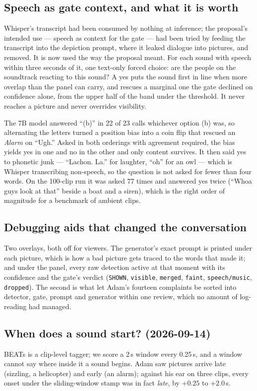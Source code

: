\documentclass[11pt,a4paper]{article}
\begin{document}
\subsection{Speech as gate context, and what it is worth}\label{sec:speechgate}
Whisper's transcript had been consumed by nothing at inference; the proposal's intended
use --- speech as context for the gate --- had been tried by feeding the transcript into
the depiction prompt, where it leaked dialogue into pictures, and removed. It is now used
the way the proposal meant. For each sound with speech within three seconds of it, one
text-only forced choice: are the people on the soundtrack reacting to this sound? A yes
puts the sound first in line when more overlap than the panel can carry, and rescues a
marginal one the gate declined on confidence alone, from the upper half of the band under
the threshold. It never reaches a picture and never overrides visibility.

The 7B model answered ``(b)'' in 22 of 23 calls whichever option (b) was, so alternating
the letters turned a position bias into a coin flip that rescued an \emph{Alarm} on
``Ugh.'' Asked in both orderings with agreement required, the bias yields yes in one and
no in the other and only content survives. It then said yes to phonetic junk ---
``Lachon. La.'' for laughter, ``oh'' for an owl --- which is Whisper transcribing
non-speech, so the question is not asked for fewer than four words. On the 100-clip run it
was asked 77 times and answered yes twice (``Whoa guys look at that'' beside a boat and a
siren), which is the right order of magnitude for a benchmark of ambient clips.

\subsection{Debugging aids that changed the conversation}\label{sec:debugstrip}
Two overlays, both off for viewers. The generator's exact prompt is printed under each
picture, which is how a bad picture gets traced to the words that made it; and under the
panel, every raw detection active at that moment with its confidence and the gate's
verdict (\texttt{SHOWN}, \texttt{visible}, \texttt{merged}, \texttt{faint},
\texttt{speech/music}, \texttt{dropped}). The second is what let Adam's fourteen complaints
be sorted into detector, gate, prompt and generator within one review, which no amount of
log-reading had managed.

\subsection{When does a sound start? (2026-09-14)}\label{sec:onset}
BEATs is a clip-level tagger; we score a 2\,s window every 0.25\,s, and a window cannot say
where inside it a sound begins. Adam saw pictures arrive late (sizzling, a helicopter) and
early (an alarm); against his ear on three clips, every onset under the sliding-window
stamp was in fact \emph{late}, by $+0.25$ to $+2.0$\,s.
\end{document}
